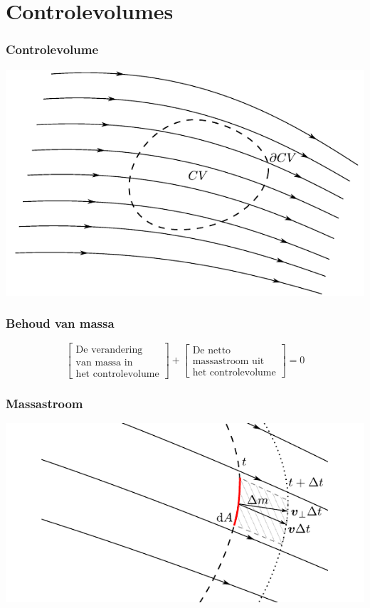 \documentclass[t]{beamer}
\begin{document}
  	\section{Controlevolumes}	
  	\begin{frame}
		\frametitle{Controlevolume}
		\center
		\includegraphics{fig/controlevolumes/Controlevolume_met_stroomlijnen}
  	\end{frame}
  	\begin{frame}
		\frametitle{Behoud van massa}
		\vspace{2cm}
		\begin{equation*}
			\left[
				\begin{array}{c}
					\mbox{De verandering} \\ \mbox{van massa in} \\ \mbox{het controlevolume}
				\end{array}
			\right]
			+
			\left[
				\begin{array}{c}
					\mbox{De netto} \\ \mbox{massastroom uit} \\ \mbox{het controlevolume}
				\end{array}
			\right]
			= 0
		\end{equation*}
	\end{frame}	
	\begin{frame}
		\frametitle{Massastroom}
		\vspace{1cm}
		\center
		\includegraphics{fig/controlevolumes/massastroom}
  	\end{frame}
\end{document}
